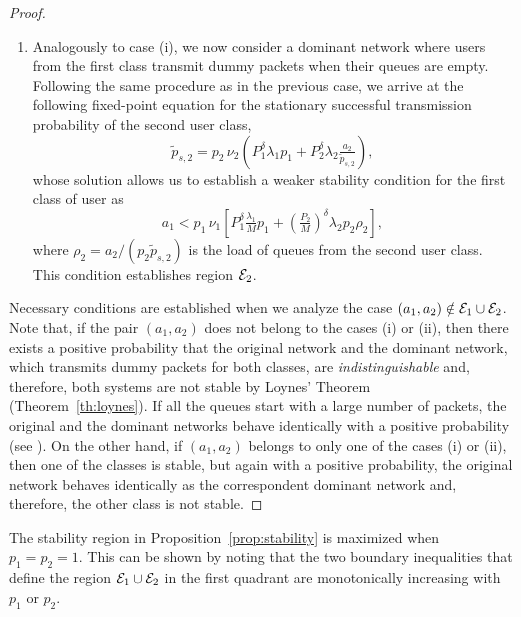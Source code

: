 \begin{proof}
\begin{enumerate}[label=(\roman*)]
    \item Analogously to case (i), we now consider a dominant network where users from the first class transmit dummy packets when their queues are empty. Following the same procedure as in the previous case, we arrive at the following fixed-point equation for the stationary successful transmission probability of the second user class,
    \begin{equation*}
    	\widetilde{p}_{s,2}
        	= p_2\,\nu_2\!\left( P_1^\delta\lambda_1 p_1
            	+ P_2^\delta\lambda_2 \tfrac{a_2}{\widetilde{p}_{s,2}} \right),
    \end{equation*}
    whose solution allows us to establish a weaker stability condition for the first class of user as
    \begin{equation}
    	a_1<p_1\,\nu_1 \left[P_1^\delta\tfrac{\lambda_1}{M}p_1+\left(\tfrac{P_2}{M}\right)^\delta\lambda_2p_2 \rho_2 \right],
    \end{equation}
    where $\rho_2 = a_2/(p_2\widetilde{p}_{s,2})$ is the load of queues from the second user class. This condition establishes region $\cal{E}_2$.
\end{enumerate}
Necessary conditions are established when we analyze the case $(a_1,a_2)\notin\cal{E}_1\cup\cal{E}_2$.
Note that, if the pair $(a_1,a_2)$ does not belong to the cases (i) or (ii), then there exists a positive probability that the original network and the dominant network, which transmits dummy packets for both classes, are \emph{indistinguishable} \cite[Section~3.2]{szpankowski1994stability} and, therefore, both systems are not stable by Loynes' Theorem (Theorem~\ref{th:loynes}). If all the queues start with a large number of packets, the original and the dominant networks behave identically with a positive probability (see \cite[Proposition~1]{stamatiou2010random}).
On the other hand, if $(a_1,a_2)$ belongs to only one of the cases (i) or (ii), then one of the classes is stable, but again with a positive probability, the original network behaves identically as the correspondent dominant network and, therefore, the other class is not stable.
\end{proof}

\begin{remark} \label{rem:stab}
The stability region in Proposition~\ref{prop:stability} is maximized when ${p_1 = p_2 = 1}$. This can be shown by noting that the two boundary inequalities that define the region $\cal{E}_1 \cup \cal{E}_2$ in the first quadrant are monotonically increasing with $p_1$ or $p_2$.
\end{remark}

